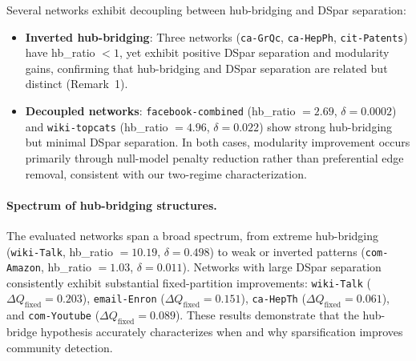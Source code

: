 \documentclass[10pt,journal,compsoc]{IEEEtran}
\begin{document}
Several networks exhibit decoupling between hub-bridging and DSpar separation:
\begin{itemize}

\item \textbf{Inverted hub-bridging}: Three networks (\texttt{ca-GrQc}, \texttt{ca-HepPh}, \texttt{cit-Patents}) have hb\_ratio $< 1$, yet exhibit positive DSpar separation and modularity gains, confirming that hub-bridging and DSpar separation are related but distinct (Remark~1).

\item \textbf{Decoupled networks}: \texttt{facebook-combined} (hb\_ratio $= 2.69$, $\delta = 0.0002$) and \texttt{wiki-topcats} (hb\_ratio $= 4.96$, $\delta = 0.022$) show strong hub-bridging but minimal DSpar separation. In both cases, modularity improvement occurs primarily through null-model penalty reduction rather than preferential edge removal, consistent with our two-regime characterization.
\end{itemize}

\paragraph{Spectrum of hub-bridging structures.}
The evaluated networks span a broad spectrum, from extreme hub-bridging (\texttt{wiki-Talk}, hb\_ratio $= 10.19$, $\delta = 0.498$) to weak or inverted patterns (\texttt{com-Amazon}, hb\_ratio $= 1.03$, $\delta = 0.011$). Networks with large DSpar separation consistently exhibit substantial fixed-partition improvements: \texttt{wiki-Talk} ($\Delta Q_{\text{fixed}} = 0.203$), \texttt{email-Enron} ($\Delta Q_{\text{fixed}} = 0.151$), \texttt{ca-HepTh} ($\Delta Q_{\text{fixed}} = 0.061$), and \texttt{com-Youtube} ($\Delta Q_{\text{fixed}} = 0.089$). These results demonstrate that the hub-bridge hypothesis accurately characterizes when and why sparsification improves community detection.
\end{document}
